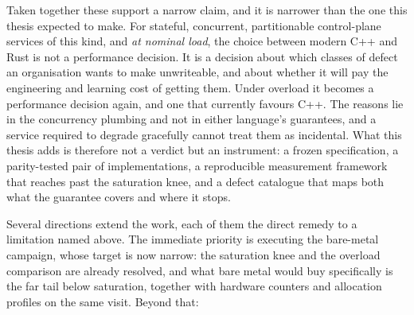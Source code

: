 \documentclass[english,twoside,openright,a4paper,censored,csm,software-track-2020]{HYthesisML}
\begin{document}
Taken together these support a narrow claim, and it is narrower than the one this thesis expected
to make. For stateful, concurrent, partitionable control-plane services of this kind, and
\emph{at nominal load}, the choice between modern C++ and Rust is not a performance decision. It
is a decision about which classes of defect an organisation wants to make unwriteable, and about
whether it will pay the engineering and learning cost of getting them. Under overload it becomes
a performance decision again, and one that currently favours C++. The reasons lie in the
concurrency plumbing and not in either language's guarantees, and a service required to degrade
gracefully cannot treat them as incidental. What this thesis adds is therefore not a verdict but
an instrument: a frozen specification, a parity-tested pair of implementations, a reproducible
measurement framework that reaches past the saturation knee, and a defect catalogue that maps
both what the guarantee covers and where it stops.

Several directions extend the work, each of them the direct remedy to a limitation named above.
The immediate priority is executing the bare-metal campaign, whose target is now narrow: the
saturation knee and the overload comparison are already resolved, and what bare metal would buy
specifically is the far tail below saturation, together with hardware counters and allocation
profiles on the same visit. Beyond that:
\end{document}
